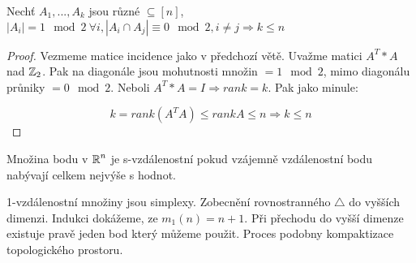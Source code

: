 \begin{theorem}
	Nechť $A_1, ... , A_k$ jsou různé $ \subseteq [n]$, $ |A_i| = 1 \mod2 \ \forall i, |A_i \cap A_j| \equiv 0 \mod2, i \ne j \Rightarrow k \leq n$
\end{theorem}
\begin{proof}
	Vezmeme matice incidence jako v předchozí větě. Uvažme matici $A^T * A$ nad $\operatorname{\mathbb{Z}}_2$. Pak na diagonále jsou mohutnosti množin $ = 1 \mod2$, mimo diagonálu průniky $= 0 \mod2$. Neboli $A^T * A = I \Rightarrow rank = k$. Pak jako minule:

	\[ k = rank(A^TA) \leq rank A \leq n \Rightarrow k \leq n \]
\end{proof}

\begin{definition}
Množina bodu v $\operatorname{\mathbb{R}}^n$ je s-vzdálenostní pokud vzájemně vzdálenostní bodu nabývají celkem nejvýše s hodnot.
\end{definition}

\begin{observation}
	1-vzdálenostní množiny jsou simplexy. Zobecnění rovnostranného $\triangle$ do vyšších dimenzi. Indukci dokážeme, ze $m_1(n) = n + 1$. Při přechodu do vyšší dimenze existuje pravě jeden bod který můžeme použit. Proces podobny kompaktizace topologického prostoru.
\end{observation}

